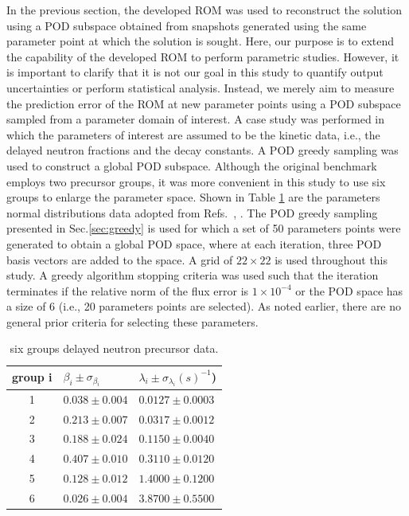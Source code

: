 \documentclass[review,number,sort&compress,12pt]{elsarticle}
\begin{document}
In the previous section, the developed ROM was used to reconstruct the solution using a POD subspace obtained from snapshots generated using the same parameter point at which the solution is sought.
Here, our purpose is to extend the capability of the developed ROM to perform parametric studies.
However, it is important to clarify that it is not our goal in this study to quantify output uncertainties or perform statistical analysis.
Instead, we merely aim to measure the prediction error of the ROM at new parameter points using a POD subspace sampled from a parameter domain of interest.
A case study was performed in which the parameters of interest are assumed to be the kinetic data, i.e., the delayed neutron fractions and the decay constants. A POD greedy sampling was used to construct a global POD subspace.
Although the original benchmark employs two precursor groups, it was more convenient in this study to use six groups to enlarge the parameter space.
Shown in Table \ref{tab: 6 groups precursor data} are the parameters normal distributions data adopted from Refs.~\cite{keepin1957delayed}, \cite{tuttle1975delayed}.
The POD greedy sampling presented in Sec.\ref{sec:greedy} is used for which a set of 50 parameters points were generated to obtain a global POD space, where at each iteration, three POD basis vectors are added to the space.
A grid of $22\times 22$ is used throughout this study.
A greedy algorithm stopping criteria was used such that the iteration terminates if the relative norm of the flux error is $1\times10^{-4}$ or the POD space has a size of 6 (i.e., 20 parameters points are selected).
As noted earlier, there are no general prior criteria for selecting these parameters.

\begin{table}[h!]
	\centering
	\begin{tabular}{c|l|l}
		group i& $\beta_i \pm \sigma_{\beta_i}$  & $\lambda_i\pm \sigma_{\lambda_i} (s)^{-1}$)  \\
		\hline
		1    &  $0.038\pm 0.004$ & $0.0127 \pm 0.0003$ \\
		2    &  $0.213 \pm 0.007$  & $0.0317 \pm 0.0012$ \\
		3    &  $0.188 \pm 0.024$ & $0.1150 \pm 0.0040$ \\
		4    &  $0.407 \pm 0.010$ & $0.3110 \pm 0.0120$ \\
		5    &  $0.128 \pm 0.012$ & $1.4000\pm0.1200$ \\
		6    &  $0.026\pm0.004$ & $3.8700\pm0.5500$ \\
	\end{tabular}
	\caption{six groups delayed neutron precursor data.}
	\label{tab: 6 groups precursor data}
\end{table}
\end{document}
